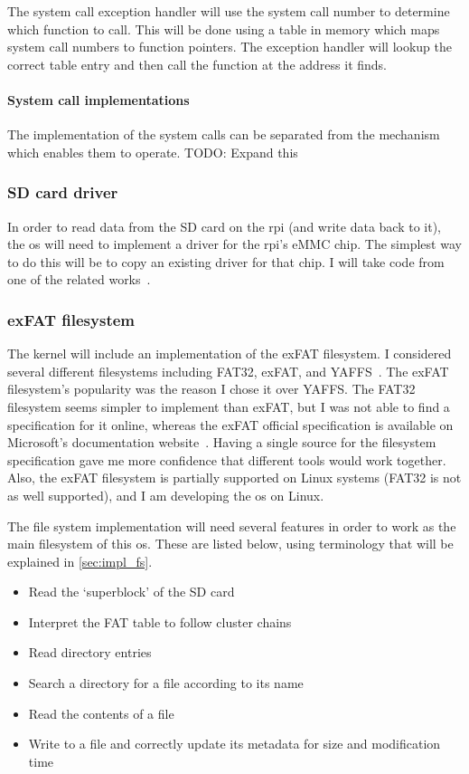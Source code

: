 \documentclass{article}
\begin{document}
The system call exception handler will use the system call number to determine
which function to call. This will be done using a table in memory which maps
system call numbers to function pointers. The exception handler will lookup the
correct table entry and then call the function at the address it finds.

\paragraph{System call implementations}
The implementation of the system calls can be separated from the mechanism
which enables them to operate.
TODO: Expand this

\subsubsection{SD card driver}
In order to read data from the SD card on the \gls{rpi} (and write data back to
it), the \gls{os} will need to implement a driver for the \gls{rpi}'s eMMC
chip. The simplest way to do this will be to copy an existing driver for that
chip. I will take code from one of the related works~\cite{rpi-boot-gh}.

\subsubsection{exFAT filesystem}
The kernel will include an implementation of the exFAT filesystem. I considered
several different filesystems including FAT32, exFAT, and
YAFFS~\cite{yaffs-fs}. The exFAT filesystem's popularity was the reason I chose
it over YAFFS. The FAT32 filesystem seems simpler to implement than exFAT, but
I was not able to find a specification for it online, whereas the exFAT
official specification is available on Microsoft's documentation
website~\cite{exFAT-specs}. Having a single source for the filesystem
specification gave me more confidence that different tools would work together.
Also, the exFAT filesystem is partially supported on Linux systems (FAT32 is
not as well supported), and I am developing the \gls{os} on Linux.

The file system implementation will need several features in order to work as
the main filesystem of this \gls{os}. These are listed below, using terminology
that will be explained in \autoref{sec:impl_fs}.

\begin{itemize}
    \item Read the `superblock' of the SD card
    \item Interpret the FAT table to follow cluster chains
    \item Read directory entries
    \item Search a directory for a file according to its name
    \item Read the contents of a file
    \item Write to a file and correctly update its metadata for size and
        modification time
\end{itemize}
\end{document}
